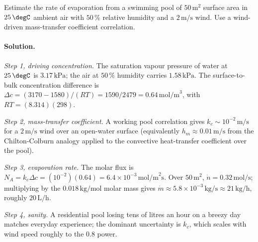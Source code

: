 \begin{exercise}
Estimate the rate of evaporation from a swimming pool of $50\,\text{m}
^2$ surface area in $25\,\degC$ ambient air with $50\,\%$ relative
humidity and a $2\,\text{m/s}$ wind. Use a wind-driven mass-transfer
coefficient correlation.

\paragraph{Solution.}
\textit{Step 1, driving concentration.} The saturation vapour pressure
of water at $25\,\degC$ is $3.17\,\text{kPa}$; the air at $50\,\%$
humidity carries $1.58\,\text{kPa}$. The surface-to-bulk concentration
difference is $\Delta c = (3170-1580)/(RT) = 1590/2479 =
0.64\,\text{mol/m}^3$, with $RT = (8.314)(298)$.

\textit{Step 2, mass-transfer coefficient.} A working pool correlation
gives $k_c \sim 10^{-2}\,\text{m/s}$ for a $2\,\text{m/s}$ wind over an
open-water surface (equivalently $h_m \approx 0.01\,\text{m/s}$ from
the Chilton-Colburn analogy applied to the convective heat-transfer
coefficient over the pool).

\textit{Step 3, evaporation rate.} The molar flux is $N_A = k_c\Delta c
= (10^{-2})(0.64) = 6.4\times 10^{-3}\,\text{mol/m}^2\text{s}$. Over
$50\,\text{m}^2$, $\dot n = 0.32\,\text{mol/s}$; multiplying by the
$0.018\,\text{kg/mol}$ molar mass gives $\dot m \approx 5.8\times
10^{-3}\,\text{kg/s} \approx 21\,\text{kg/h}$, roughly $20\,\text{L/h}$.

\textit{Step 4, sanity.} A residential pool losing tens of litres an
hour on a breezy day matches everyday experience; the dominant
uncertainty is $k_c$, which scales with wind speed roughly to the
$0.8$ power.
\end{exercise}

